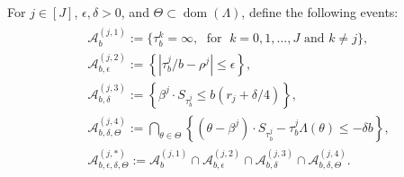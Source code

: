 \documentclass[aap,preprint]{imsart}
\theoremstyle{plain}
\theoremstyle{definition}
\begin{document}
\begin{appendix}
For $j \in [J]$, $\epsilon, \delta > 0$, and $\Theta \subset \operatorname{dom}(\Lambda)$, define the following events:
\begin{align}\label{def:aux_A_epsilon}
\begin{split}
  & \mathcal{A}_{b}^{(j,1)}  :=   
 \{\tau_b^k = \infty,\; \text{ for } \;k =0,1,\ldots,J \text{ and } k \neq j\},\\
   &\mathcal{A}_{b,\epsilon}^{(j,2)}  :=   \left\{\left|{\tau_b^j}/{b} - \rho^{j}\right| \leq \epsilon \right\},\\
& \mathcal{A}_{b, \delta}^{(j, 3)}  :=  
\left\{ \beta^j \cdot S_{\tau_b^j} \leq b(r_j +  \delta/4)  \right\},\\
 & \mathcal{A}_{b, \delta,\Theta}^{(j,4)}  := \bigcap_{\theta \in \Theta}   \left\{(\theta-\beta^j) \cdot S_{\tau_b^j} - \tau_b^j \Lambda(\theta)  \leq 
- \delta b 
\right\},\\
& \mathcal{A}_{b,\epsilon,\delta,\Theta}^{(j,*)}  := \mathcal{A}_{b}^{(j,1)} \cap \mathcal{A}_{b,\epsilon}^{(j,2)} \cap \mathcal{A}_{b,\delta}^{(j,3)} \cap \mathcal{A}_{b,\delta,\Theta}^{(j,4)}.
\end{split}
\end{align}


\end{appendix}
\end{document}
